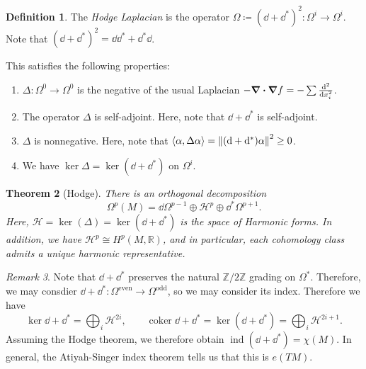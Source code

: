 \documentclass[leqno, openany]{memoir}
\newtheorem{thm}{Theorem}[section]
\theoremstyle{definition}
\newtheorem{defn}[thm]{Definition}
\theoremstyle{remark}
\newtheorem{rmk}[thm]{Remark}
\theoremstyle{plain}
\theoremstyle{definition}
\theoremstyle{remark}
\newcommand{\R}{\mathbb{R}}
\newcommand{\Z}{\mathbb{Z}}
\newcommand{\mc}[1]{\mathcal{#1}}
\newcommand{\mr}[1]{\mathrm{#1}}
\DeclareMathOperator{\coker}{coker}
\DeclareMathOperator{\ind}{ind}
\begin{document}
\begin{defn} The \textit{Hodge Laplacian} is the operator $\Omega \coloneqq
{(\dd + \dd^*)}^2 \colon \Omega^i \to \Omega^i$. Note that ${(\dd + \dd^*)}^2 =
\dd \dd^* + \dd^* \dd$.  \end{defn}

This satisfies the following properties: \begin{enumerate} \item $\Delta \colon
    \Omega^0 \to \Omega^0$ is the negative of the usual Laplacian $- \div \grad
    f = - \sum \dv[2]{x_i}$.  \item The operator $\Delta$ is self-adjoint.
    Here, note that $\dd + \dd^*$ is self-adjoint.  \item $\Delta$ is
    nonnegative. Here, note that $\ev{\alpha, \Delta \alpha} = \norm{(\dd +
    \dd^*) \alpha}^2 \geq 0$.  \item We have $\ker \Delta = \ker (\dd + \dd^*)$
    on $\Omega^i$.  \end{enumerate}

\begin{thm}[Hodge] There is an orthogonal decomposition \[ \Omega^p(M) = \dd
\Omega^{p-1} \oplus \mc{H}^p \oplus \dd^* \Omega^{p+1}. \] Here, $\mc{H} =
\ker(\Delta) = \ker(\dd + \dd^*)$ is the space of \textit{Harmonic forms}. In
addition, we have $\mc{H}^p \cong H^p(M, \R)$, and in particular, each
cohomology class admits a unique harmonic representative.  \end{thm}

\begin{rmk} Note that $\dd + \dd^*$ preserves the natural $\Z/2\Z$ grading on
    $\Omega^*$. Therefore, we may consdier $\dd + \dd^* \colon
    \Omega^{\mr{even}} \to \Omega^{\mr{odd}}$, so we may consider its index.
    Therefore we have \[ \ker \dd + \dd^* = \bigoplus_{i} \mc{H}^{2i}, \qquad
    \coker \dd + \dd^* = \ker (\dd + \dd^*) = \bigoplus_i \mc{H}^{2i+1}. \]
Assuming the Hodge theorem, we therefore obtain $\ind(\dd + \dd^*) = \chi(M)$.
In general, the Atiyah-Singer index theorem tells us that this is $e(TM)$.
\end{rmk}
\end{document}
